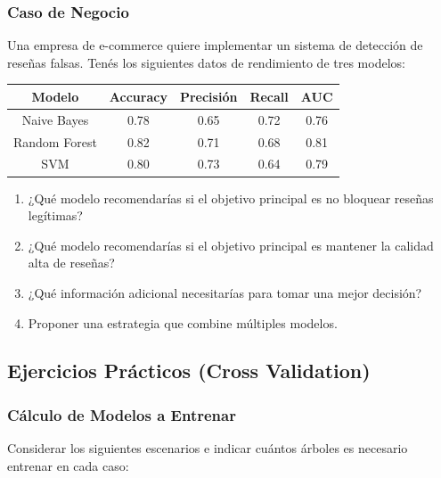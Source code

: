 \documentclass[12pt]{article}
\begin{document}
\subsubsection{Caso de Negocio}

Una empresa de e-commerce quiere implementar un sistema de detección de reseñas falsas. Tenés los siguientes datos de rendimiento de tres modelos:

\begin{table}[H]
    \centering
    \begin{tabular}{|c|c|c|c|c|}
        \hline
        \textbf{Modelo} & \textbf{Accuracy} & \textbf{Precisión} & \textbf{Recall} & \textbf{AUC} \\
        \hline
        Naive Bayes & 0.78 & 0.65 & 0.72 & 0.76 \\
        \hline
        Random Forest & 0.82 & 0.71 & 0.68 & 0.81 \\
        \hline
        SVM & 0.80 & 0.73 & 0.64 & 0.79 \\
        \hline
    \end{tabular}
\end{table}

\begin{enumerate}
    \item[a.] ¿Qué modelo recomendarías si el objetivo principal es no bloquear reseñas legítimas?
    \item[b.] ¿Qué modelo recomendarías si el objetivo principal es mantener la calidad alta de reseñas?
    \item[c.] ¿Qué información adicional necesitarías para tomar una mejor decisión?
    \item[d.] Proponer una estrategia que combine múltiples modelos.
\end{enumerate}

\subsection{Ejercicios Prácticos (Cross Validation)}

\subsubsection{Cálculo de Modelos a Entrenar}

Considerar los siguientes escenarios e indicar cuántos árboles es necesario entrenar en cada caso:
\end{document}
